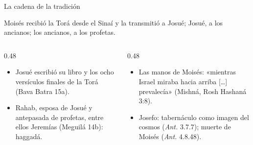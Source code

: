 \begin{frame}{La cadena de la tradición}
\par\smallskip
\begin{cita}Moisés recibió la Torá desde el Sinaí y la transmitió a Josué; Josué, a los ancianos; los ancianos, a los profetas.\end{cita}
\elabpropia
\vspace{2pt}
\begin{columns}[T,onlytextwidth]
\begin{column}{0.48\textwidth}\scriptsize
\begin{itemize}
\item Josué escribió su libro y los ocho versículos finales de la Torá (Bava Batra 15a).
\item Rahab, esposa de Josué y antepasada de profetas, entre ellos Jeremías (Meguilá 14b): haggadá.
\end{itemize}
\end{column}
\begin{column}{0.48\textwidth}\scriptsize
\begin{itemize}
\item Las manos de Moisés: «mientras Israel miraba hacia arriba [\ldots] prevalecía» (Mishná, Rosh Hashaná 3:8).
\item Josefo: tabernáculo como imagen del cosmos (\emph{Ant.} 3.7.7); muerte de Moisés (\emph{Ant.} 4.8.48).
\end{itemize}
\end{column}
\end{columns}
\end{frame}

